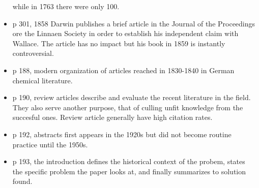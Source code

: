 \begin{itemize}
while in 1763 there were only 100.
\item p 301, 1858 Darwin publishes a brief article in the Journal of the
Proceedings ore the Linnaen Society in order to establish his independent 
claim with Wallace. The article has no impact but his book in 1859 is
instantly controversial.
\item p 188, modern organization of articles reached in 1830-1840 in
German chemical literature.
\item p 190, review articles describe and evaluate the recent literature
in the field.  They also serve another purpose, that of culling unfit
knowledge from the succesful ones. Review article generally have high
citation rates.
\item p 192, abstracts first appears in the 1920s but did not become
routine practice until the 1950s.
\item p 193, the introduction defines the historical context of the probem,
states the specific problem the paper looks at, and finally summarizes to
solution found.
\end{itemize}

